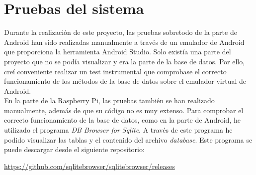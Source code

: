 \section{Pruebas del sistema}

Durante la realización de este proyecto, las pruebas sobretodo de la parte de Android han sido realizadas manualmente a través de un emulador de Android que proporciona la herramienta Android Studio. Solo existía una parte del proyecto que no se podía visualizar y era la parte de la base de datos. Por ello, creí conveniente realizar un test instrumental que comprobase el correcto funcionamiento de los métodos de la base de datos sobre el emulador virtual de Android.\\
En la parte de la Raspberry Pi, las pruebas también se han realizado manualmente, además de que su código no es muy extenso. Para comprobar el correcto funcionamiento de la base de datos, como en la parte de Android, he utilizado el programa \textit{DB Browser for Sqlite}. A través de este programa he podido visualizar las tablas y el contenido del archivo \textit{database}. Este programa se puede descargar desde el siguiente repositorio:

\url{https://github.com/sqlitebrowser/sqlitebrowser/releases}